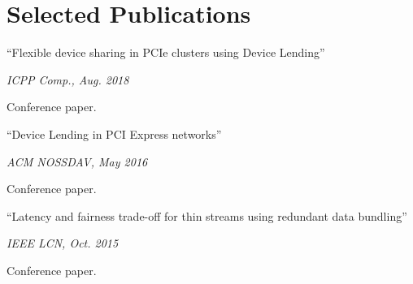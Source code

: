 \section{Selected Publications}
\parbox[t][][t]{\linewidth}{
	\parbox{\linewidth}{{``Flexible device sharing in PCIe clusters using Device Lending''}}
	\smallbreak
	\parbox{\linewidth}{\emph{ICPP Comp., Aug. 2018}}
	\smallbreak
	Conference paper.
	\bigbreak
}

\parbox[t][][t]{\linewidth}{
	\parbox{\linewidth}{{``Device Lending in PCI Express networks''}}
	\smallbreak
	\parbox{\linewidth}{\emph{ACM NOSSDAV, May 2016}}
	\smallbreak
	Conference paper.
	\bigbreak
}

\parbox[t][][t]{\linewidth}{
	\parbox{\linewidth}{{``Latency and fairness trade-off for thin
	streams using redundant data bundling''}}
	\smallbreak
	\parbox{\linewidth}{\emph{IEEE LCN, Oct. 2015}}
	\smallbreak
	Conference paper.
	\bigbreak
}

